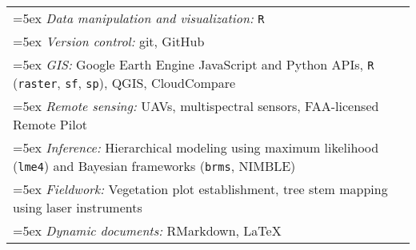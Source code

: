 \begin{longtable}{@{}>{\raggedright}p{5.25in} >{\raggedleft}X@{}}

\hangindent=5ex \emph{Data manipulation and visualization:} \texttt{R} & \tabularnewline
\hangindent=5ex \emph{Version control:} git, GitHub & \tabularnewline
\hangindent=5ex \emph{GIS:} Google Earth Engine JavaScript and Python APIs, \texttt{R} (\texttt{raster}, \texttt{sf}, \texttt{sp}), QGIS, CloudCompare & \tabularnewline
\hangindent=5ex \emph{Remote sensing:} UAVs, multispectral sensors, FAA-licensed Remote Pilot & \tabularnewline
\hangindent=5ex \emph{Inference:} Hierarchical modeling using maximum likelihood (\texttt{lme4}) and Bayesian frameworks (\texttt{brms}, NIMBLE) & \tabularnewline
\hangindent=5ex \emph{Fieldwork:} Vegetation plot establishment, tree stem mapping using laser instruments & \tabularnewline
\hangindent=5ex \emph{Dynamic documents:} RMarkdown, \LaTeX{} & \tabularnewline

\end{longtable}